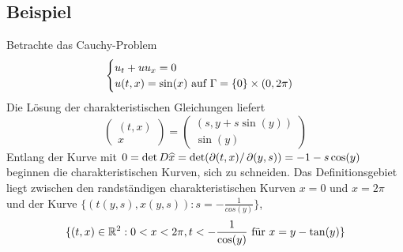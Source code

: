 \subsection{Beispiel}
\label{bsp_12}
	Betrachte das Cauchy-Problem \marginnote{[12]}
	\[ \begin{cases}
		u_t + uu_x = 0 \\
		u(t,x) = \sin(x) \text{ auf } \Gamma = \{0\} \times (0,2\pi)
		\end{cases} \]
	Die Lösung der charakteristischen Gleichungen liefert
	\[ \begin{pmatrix} (t,x) \\ x \end{pmatrix} = \begin{pmatrix} (s,y+s \sin(y)) \\ \sin(y) \end{pmatrix} \]
	Entlang der Kurve mit $0 = \det D\widehat{x} = \det(\operatorname{\partial}(t,x)/\operatorname{\partial}(y,s)) = -1 -s \cos(y)$ beginnen die charakteristischen Kurven, sich zu schneiden. Das Definitionsgebiet liegt zwischen den randständigen charakteristischen Kurven $x=0$ und $x=2\pi$ und der Kurve $\{(t(y,s),x(y,s)) : s = -\frac{1}{cos(y)}\}$,
	\[ \{(t,x) \in \mathbb{R}^2 : 0 < x < 2\pi, t < - \frac{1}{\cos(y)} \text{ für } x=y-\tan(y) \} \]
\newpage